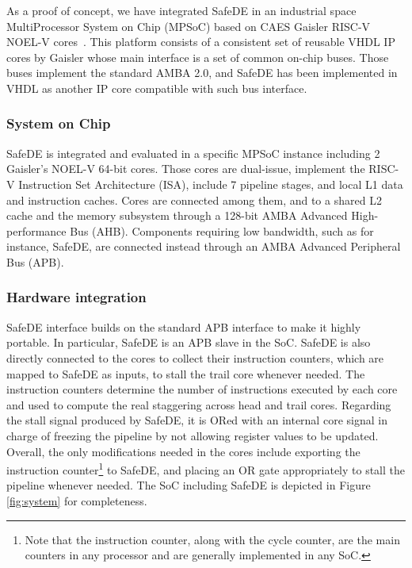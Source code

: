 As a proof of concept, we have integrated SafeDE in an industrial space MultiProcessor System on Chip (MPSoC) based on CAES Gaisler RISC-V NOEL-V cores~\cite{SELENEgit}. This platform consists of a consistent set of reusable VHDL IP cores by Gaisler whose main interface is a set of common on-chip buses. Those buses implement the standard AMBA 2.0, and SafeDE has been implemented in VHDL as another IP core compatible with such bus interface.

\subsubsection{System on Chip}
SafeDE is integrated and evaluated in a specific MPSoC instance including 2 Gaisler's NOEL-V 64-bit cores. Those cores are dual-issue, implement the RISC-V Instruction Set Architecture (ISA), include 7 pipeline stages, and local L1 data and instruction caches. Cores are connected among them, and to a shared L2 cache and the memory subsystem through a 128-bit AMBA Advanced High-performance Bus (AHB). Components requiring low bandwidth, such as for instance, SafeDE, are connected instead through an AMBA Advanced Peripheral Bus (APB).

\subsubsection{Hardware integration}
SafeDE interface builds on the standard APB interface to make it highly portable. In particular, SafeDE is an APB slave in the SoC.
SafeDE is also directly connected to the cores to collect their instruction counters, which are mapped to SafeDE as inputs, to stall the trail core whenever needed. The instruction counters determine the number of instructions executed by each core and used to compute the real staggering across head and trail cores. Regarding the stall signal produced by SafeDE, it is ORed with an internal core signal in charge of freezing the pipeline by not allowing register values to be updated. Overall, the only modifications needed in the cores include exporting the instruction counter\footnote{Note that the instruction counter, along with the cycle counter, are the main counters in any processor and are generally implemented in any SoC.} to SafeDE, and placing an OR gate appropriately to stall the pipeline whenever needed.
The SoC including SafeDE is depicted in Figure \ref{fig:system} for completeness.

